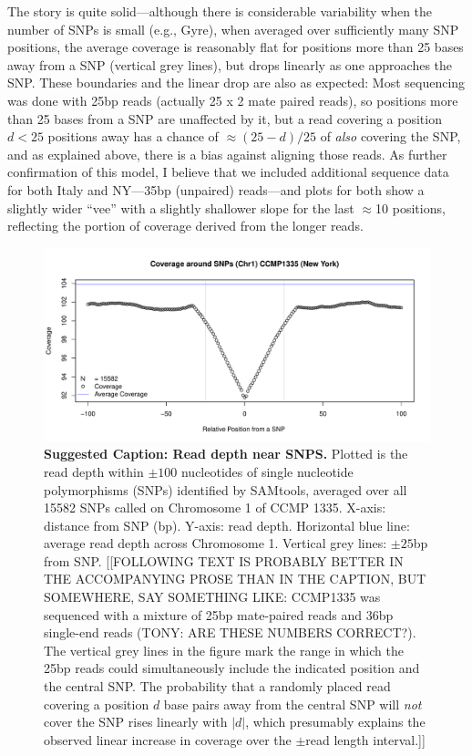 \documentclass{article}\usepackage[]{graphicx}\usepackage[]{color}
\begin{document}
The story is quite solid---although there is considerable variability when the number of SNPs is
small (e.g., Gyre), when averaged over sufficiently many SNP positions, the average coverage is
reasonably flat for positions more than 25 bases away from a SNP (vertical grey lines), but drops 
linearly as one approaches the SNP.  These boundaries and the linear drop are also as expected: Most
sequencing was done with 25bp reads (actually 25 x 2 mate paired reads), so positions more than 25 
bases from a SNP are unaffected by it, but a read covering a position $d<25$ positions away has a 
chance of $\approx (25-d)/25$ of \emph{also} covering the SNP, and as explained above, there is a 
bias against aligning those reads.  As further confirmation of this model, I believe that we 
included additional sequence data for both Italy and NY---35bp (unpaired) reads---and plots for both 
show a slightly wider ``vee'' with a slightly shallower slope for the last $\approx$10 positions, 
reflecting the portion of coverage derived from the longer reads.

\newpage
\begin{figure}[h]
\begin{center}
\includegraphics[width=\linewidth]{FigS5-SNPdip-figs/snpdip-chr1-1335.pdf}
\end{center}
\caption{{\bf Suggested Caption: Read depth near SNPS.} Plotted is the read depth within $\pm100$ nucleotides of single nucleotide polymorphisms (SNPs) identified by SAMtools, averaged over all 15582 SNPs called on Chromosome 1 of CCMP 1335.  X-axis: distance from SNP (bp).  Y-axis: read depth.  Horizontal blue line: average read depth across Chromosome 1.  Vertical grey lines: $\pm25$bp from SNP.  [[FOLLOWING TEXT IS PROBABLY BETTER IN THE ACCOMPANYING PROSE THAN IN THE CAPTION, BUT SOMEWHERE, SAY SOMETHING LIKE: CCMP1335 was sequenced with a mixture of 25bp mate-paired reads and 36bp single-end reads (TONY: ARE THESE NUMBERS CORRECT?).  The vertical grey lines in the figure mark the range in which the 25bp reads could simultaneously include the indicated position and the central SNP.  The probability that a randomly placed read covering a position $d$ base pairs away from the central SNP will \emph{not} cover the SNP rises linearly with $|d|$, which presumably explains the observed linear increase in coverage over the $\pm$read length interval.]]}
\end{figure}
\end{document}
